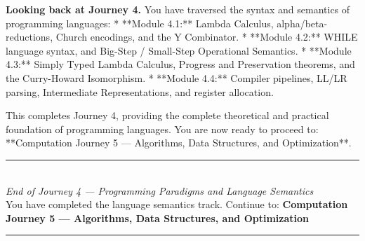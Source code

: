 \documentclass[12pt, a4paper]{book}
\begin{document}
\medskip
\noindent\textbf{Looking back at Journey 4.}
You have traversed the syntax and semantics of programming languages:
* **Module 4.1:** Lambda Calculus, alpha/beta-reductions, Church encodings, and the Y Combinator.
* **Module 4.2:** WHILE language syntax, and Big-Step / Small-Step Operational Semantics.
* **Module 4.3:** Simply Typed Lambda Calculus, Progress and Preservation theorems, and the Curry-Howard Isomorphism.
* **Module 4.4:** Compiler pipelines, LL/LR parsing, Intermediate Representations, and register allocation.

This completes Journey 4, providing the complete theoretical and practical foundation of programming languages. You are now ready to proceed to: **Computation Journey 5 --- Algorithms, Data Structures, and Optimization**.

\vspace{1.4cm}
\begin{center}
{\color{JourneyColor}\rule{0.5\linewidth}{0.8pt}}\\[6pt]
{\small\color{JourneyColor}\textit{End of Journey 4 --- Programming Paradigms and Language Semantics}}\\[4pt]
{\small\color{JourneyColor}You have completed the language semantics track. Continue to: \textbf{Computation Journey 5 --- Algorithms, Data Structures, and Optimization}}\\[6pt]
{\color{JourneyColor}\rule{0.5\linewidth}{0.8pt}}
\end{center}
\end{document}
